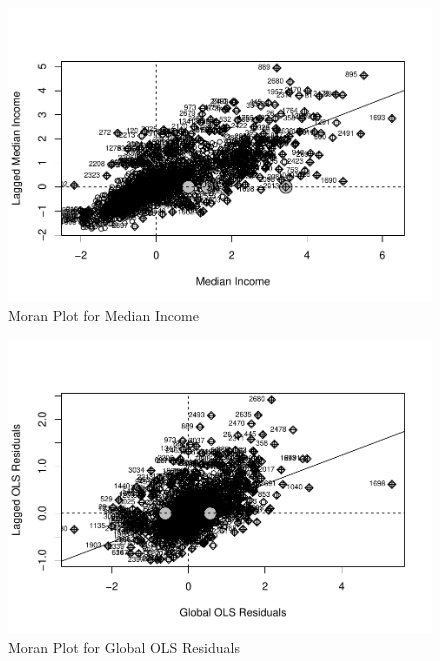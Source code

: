 \documentclass[
]{article}
\begin{document}
\begin{figure}[H]

{\centering \includegraphics[width=1\linewidth]{final-project-write-up-nathan-nguyen_files/figure-latex/unnamed-chunk-10-1} 

}

\caption{Moran Plot for Median Income}\label{fig:unnamed-chunk-10}
\end{figure}

\begin{figure}[H]

{\centering \includegraphics[width=1\linewidth]{final-project-write-up-nathan-nguyen_files/figure-latex/unnamed-chunk-11-1} 

}

\caption{Moran Plot for Global OLS Residuals}\label{fig:unnamed-chunk-11}
\end{figure}
\end{document}
